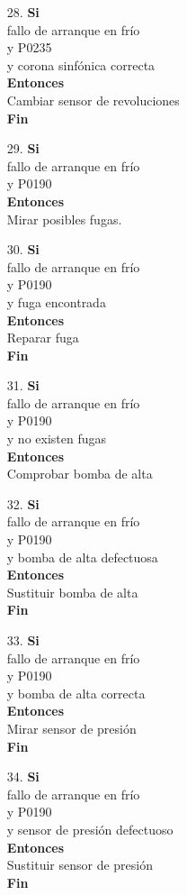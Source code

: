 \documentclass[a4paper,12pt]{article}
\newcommand\tab[1][1cm]{\hspace*{#1}}
\begin{document}
\begin{itemize}
\item[28.]\textbf{Si}\\ \tab fallo de arranque en frío\\ \tab y P0235\\ \tab y corona sinfónica correcta \\ \textbf{Entonces}\\ \tab Cambiar sensor de revoluciones \\ \tab \textbf{Fin}
\item[29.]\textbf{Si}\\ \tab fallo de arranque en frío\\ \tab y P0190\\ \textbf{Entonces}\\ \tab Mirar posibles fugas.
\item[30.]\textbf{Si}\\ \tab fallo de arranque en frío\\ \tab y P0190\\ \tab y fuga encontrada \\ \textbf{Entonces}\\ \tab Reparar fuga\\ \tab \textbf{Fin}
\item[31.]\textbf{Si}\\ \tab fallo de arranque en frío\\ \tab y P0190\\ \tab y no existen fugas \\ \textbf{Entonces}\\ \tab Comprobar bomba de alta
\item[32.]\textbf{Si}\\ \tab fallo de arranque en frío\\ \tab y P0190\\ \tab y bomba de alta defectuosa \\ \textbf{Entonces}\\ \tab Sustituir bomba de alta \\ \tab \textbf{Fin}
\item[33.]\textbf{Si}\\ \tab fallo de arranque en frío\\ \tab y P0190\\ \tab y bomba de alta correcta \\ \textbf{Entonces}\\ \tab Mirar sensor de presión \\ \tab \textbf{Fin}
\item[34.]\textbf{Si}\\ \tab fallo de arranque en frío\\ \tab y P0190\\ \tab y sensor de presión defectuoso \\ \textbf{Entonces}\\ \tab Sustituir sensor de presión \\ \tab \textbf{Fin}

\end{itemize}
\end{document}
